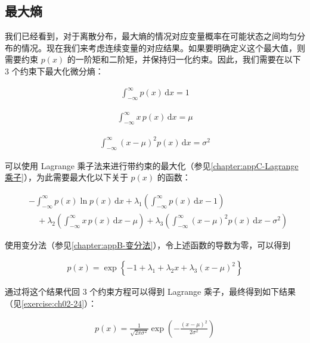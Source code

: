 \documentclass[../../main.tex]{subfiles}
\begin{document}
\subsection{最大熵}\label{subsection:ch02-最大熵}

我们已经看到，对于离散分布，最大熵的情况对应变量概率在可能状态之间均匀分布的情况。现在我们来考虑连续变量的对应结果。如果要明确定义这个最大值，则需要约束 $p(x)$ 的一阶矩和二阶矩，并保持归一化约束。因此，我们需要在以下 $3$ 个约束下最大化微分熵：

\begin{align}
  \int_{-\infty}^{\infty} p(x)\,\mathrm{d}x = 1
  \label{align:ch02-最大熵约束1}
\end{align}

\begin{align}
  \int_{-\infty}^{\infty} x\,p(x)\,\mathrm{d}x = \mu
  \label{align:ch02-最大熵约束2}
\end{align}

\begin{align}
  \int_{-\infty}^{\infty} (x-\mu)^{2}p(x)\,\mathrm{d}x = \sigma^{2}
  \label{align:ch02-最大熵约束3}
\end{align}

可以使用 Lagrange 乘子法来进行带约束的最大化（参见\cref{chapter:appC-Lagrange乘子}），为此需要最大化以下关于 $p(x)$ 的函数：

\begin{align}
  & -\int_{-\infty}^{\infty} p(x)\ln p(x)\,\mathrm{d}x + \lambda_1\left(\int_{-\infty}^{\infty} p(x)\,\mathrm{d}x - 1\right) \nonumber \\
  & \quad + \lambda_2\left(\int_{-\infty}^{\infty} x\,p(x)\,\mathrm{d}x - \mu\right) + \lambda_3\left(\int_{-\infty}^{\infty}(x-\mu)^{2}p(x)\,\mathrm{d}x - \sigma^{2}\right)
  \label{align:ch02-最大熵泛函}
\end{align}

使用变分法（参见\cref{chapter:appB-变分法}），令上述函数的导数为零，可以得到

\begin{align}
  p(x) = \exp\left\{-1 + \lambda_1 + \lambda_2 x + \lambda_3(x-\mu)^{2}\right\}
  \label{align:ch02-最大熵形式}
\end{align}

通过将这个结果代回 $3$ 个约束方程可以得到 Lagrange 乘子，最终得到如下结果（见\cref{exercise:ch02-24}）：

\begin{align}
  p(x) = \frac{1}{\sqrt{2\pi\sigma^{2}}}\exp\left(-\frac{(x-\mu)^{2}}{2\sigma^{2}}\right)
  \label{align:ch02-最大熵Gauss}
\end{align}
\end{document}
